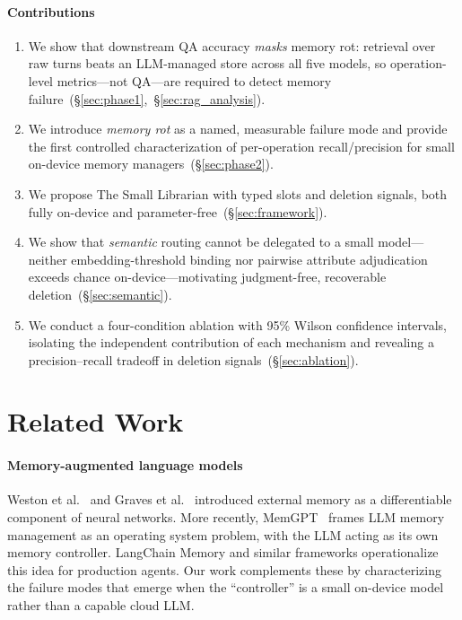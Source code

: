 \documentclass[10pt, twocolumn]{article}
\begin{document}
\paragraph{Contributions}
\begin{enumerate}[leftmargin=*, itemsep=1pt, topsep=2pt]
  \item We show that downstream QA accuracy \emph{masks} memory rot: retrieval
    over raw turns beats an LLM-managed store across all five models, so
    operation-level metrics---not QA---are required to detect memory
    failure~(\S\ref{sec:phase1},~\S\ref{sec:rag_analysis}).
  \item We introduce \emph{memory rot} as a named, measurable failure mode
    and provide the first controlled characterization of per-operation
    recall/precision for small on-device memory managers~(\S\ref{sec:phase2}).
  \item We propose The Small Librarian with typed slots and deletion signals,
    both fully on-device and parameter-free~(\S\ref{sec:framework}).
  \item We show that \emph{semantic} routing cannot be delegated to a small
    model---neither embedding-threshold binding nor pairwise attribute
    adjudication exceeds chance on-device---motivating judgment-free, recoverable
    deletion~(\S\ref{sec:semantic}).
  \item We conduct a four-condition ablation with 95\% Wilson confidence
    intervals, isolating the independent contribution of each mechanism and
    revealing a precision--recall tradeoff in deletion signals~(\S\ref{sec:ablation}).
\end{enumerate}

\section{Related Work}
\label{sec:related}

\paragraph{Memory-augmented language models}
Weston et al.~\cite{weston2014memory} and Graves et al.~\cite{graves2014neural}
introduced external memory as a differentiable component of neural networks.
More recently, MemGPT~\cite{packer2023memgpt} frames LLM memory management
as an operating system problem, with the LLM acting as its own memory
controller.
LangChain Memory and similar frameworks operationalize this idea for
production agents.
Our work complements these by characterizing the failure modes that emerge
when the ``controller'' is a small on-device model rather than a capable
cloud LLM.
\end{document}
